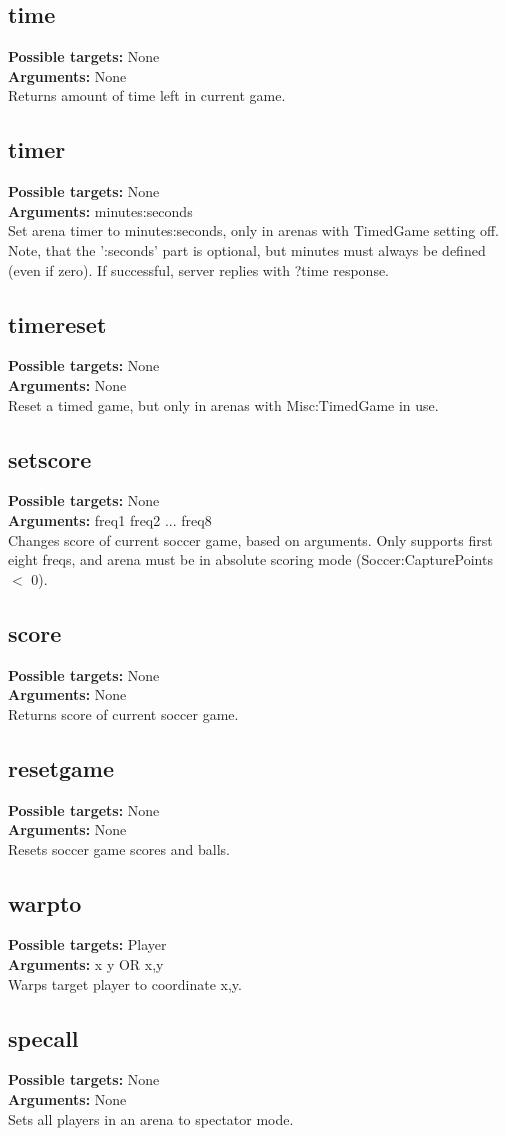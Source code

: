 \documentclass{article}
\newcommand{\targets}[1]{\noindent\textbf{Possible targets:} #1\\}
\newcommand{\args}[1]{\noindent\textbf{Arguments:} #1\\}
\begin{document}
\subsection{time}
\targets{None}
\args{None}
Returns amount of time left in current game.

\subsection{timer}
\targets{None}
\args{minutes:seconds}
Set arena timer to minutes:seconds, only in arenas with TimedGame setting
off. Note, that the ':seconds' part is optional, but minutes must always
be defined (even if zero). If successful, server replies with ?time response.

\subsection{timereset}
\targets{None}
\args{None}
Reset a timed game, but only in arenas with Misc:TimedGame in use.

\subsection{setscore}
\targets{None}
\args{freq1 freq2 ... freq8}
Changes score of current soccer game, based on arguments. Only supports
first eight freqs, and arena must be in absolute scoring mode 
(Soccer:CapturePoints $<$ 0).

\subsection{score}
\targets{None}
\args{None}
Returns score of current soccer game.

\subsection{resetgame}
\targets{None}
\args{None}
Resets soccer game scores and balls.

\subsection{warpto}
\targets{Player}
\args{x y OR x,y}
Warps target player to coordinate x,y.

\subsection{specall}
\targets{None}
\args{None}
Sets all players in an arena to spectator mode.
\end{document}
